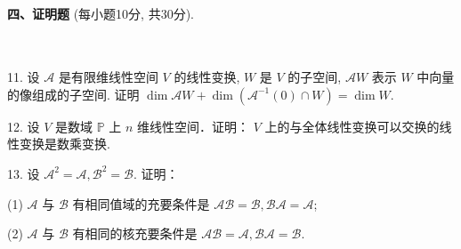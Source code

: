\documentclass[11pt,a4paper]{article}
\renewcommand{\arraystretch}{0.8}
\begin{document}
	
	
	
	\vspace*{10cm}
	
	{\bf 四、证明题}
	{(每小题10分, 共30分).}
	\renewcommand{\arraystretch}{1.2}
	\hfill
	\begin{tabular}{|c|c|}
		\hline
		\makebox[2.5em]{得分} & \makebox[3.0em]{} \\
		\hline
	\end{tabular}
	\renewcommand{\arraystretch}{1.0}\\
	11. 设  $\mathscr{A}$  是有限维线性空间  $V$  的线性变换, $W$  是  $V$  的子空间,  $\mathscr{A} W$  表示  $W$  中向量的像组成的子空间. 证明 $\operatorname{dim} \mathscr{A} W+\operatorname{dim}\left(\mathscr{A}^{-1}(0) \cap W\right)=\operatorname{dim} W$.
\vspace*{7cm}
	
	12. 设  $V$  是数域  $\mathbb{P}$  上  $n$  维线性空间．证明： $V$  上的与全体线性变换可以交换的线性变换是数乘变换.
	
	
	\vspace*{7cm}
	
	
	13. 设  $\mathscr{A}^{2}=\mathscr{A}, \mathscr{B}^{2}=\mathscr{B}$. 证明： \par
	(1) $\mathscr{A}$  与   $\mathscr{B}$  有相同值域的充要条件是  $\mathscr{A}  \mathscr{B}= \mathscr{B},  \mathscr{B} \mathscr{A}=\mathscr{A}$;\par
	(2) $\mathscr{A}$ 与   $\mathscr{B}$  有相同的核充要条件是  $\mathscr{A}  \mathscr{B}=\mathscr{A},  \mathscr{B} \mathscr{A}= \mathscr{B}$.
	
	
	
\end{document}
